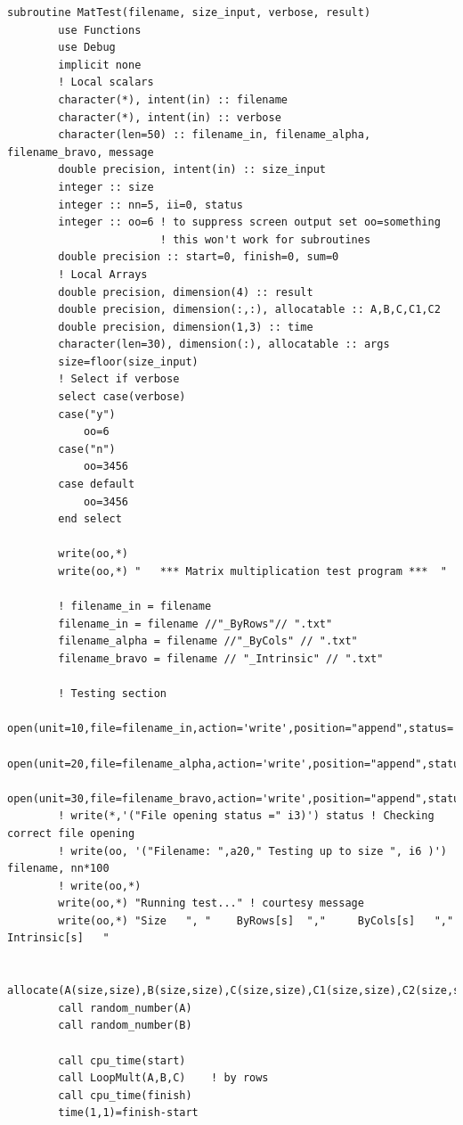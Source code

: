 \documentclass[a4paper]{article}
\begin{document}
\begin{lstlisting}
subroutine MatTest(filename, size_input, verbose, result)
        use Functions
        use Debug
        implicit none
        ! Local scalars
        character(*), intent(in) :: filename
        character(*), intent(in) :: verbose
        character(len=50) :: filename_in, filename_alpha, filename_bravo, message
        double precision, intent(in) :: size_input
        integer :: size
        integer :: nn=5, ii=0, status
        integer :: oo=6 ! to suppress screen output set oo=something
                        ! this won't work for subroutines
        double precision :: start=0, finish=0, sum=0
        ! Local Arrays
        double precision, dimension(4) :: result
        double precision, dimension(:,:), allocatable :: A,B,C,C1,C2
        double precision, dimension(1,3) :: time
        character(len=30), dimension(:), allocatable :: args
        size=floor(size_input)
        ! Select if verbose
        select case(verbose)
        case("y")
            oo=6
        case("n")
            oo=3456
        case default
            oo=3456
        end select

        write(oo,*)
        write(oo,*) "   *** Matrix multiplication test program ***  "
        
        ! filename_in = filename
        filename_in = filename //"_ByRows"// ".txt"
        filename_alpha = filename //"_ByCols" // ".txt"
        filename_bravo = filename // "_Intrinsic" // ".txt"

        ! Testing section 
        open(unit=10,file=filename_in,action='write',position="append",status='unknown',iostat=status)
        open(unit=20,file=filename_alpha,action='write',position="append",status='unknown',iostat=status)
        open(unit=30,file=filename_bravo,action='write',position="append",status='unknown',iostat=status)
        ! write(*,'("File opening status =" i3)') status ! Checking correct file opening
        ! write(oo, '("Filename: ",a20," Testing up to size ", i6 )') filename, nn*100
        ! write(oo,*)
        write(oo,*) "Running test..." ! courtesy message
        write(oo,*) "Size   ", "    ByRows[s]  ","     ByCols[s]   ","    Intrinsic[s]   "
        
        allocate(A(size,size),B(size,size),C(size,size),C1(size,size),C2(size,size))
        call random_number(A)
        call random_number(B)
        
        call cpu_time(start)
        call LoopMult(A,B,C)    ! by rows
        call cpu_time(finish)
        time(1,1)=finish-start


\end{lstlisting}
\end{document}
